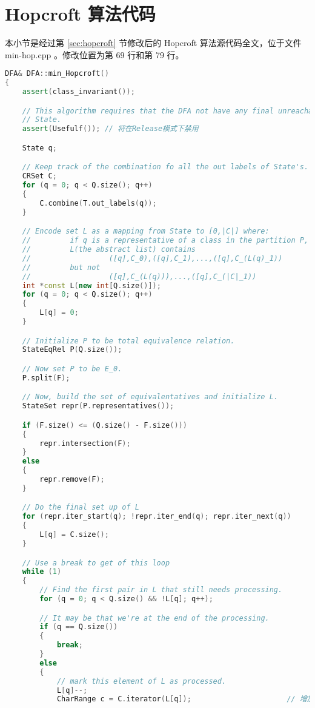 \section{Hopcroft 算法代码}

本小节是经过第 \ref{sec:hopcroft} 节修改后的 Hopcroft 算法源代码全文，位于文件 min-hop.cpp 。修改位置为第 69 行和第 79 行。

\begin{lstlisting}[language=C++,label={lst:hop},caption={文件 min-hop.cpp}]
DFA& DFA::min_Hopcroft()
{
    assert(class_invariant());

    // This algorithm requires that the DFA not have any final unreachable
    // State.
    assert(Usefulf()); // 将在Release模式下禁用

    State q;

    // Keep track of the combination fo all the out labels of State's.
    CRSet C;
    for (q = 0; q < Q.size(); q++)
    {
        C.combine(T.out_labels(q));
    }

    // Encode set L as a mapping from State to [0,|C|] where:
    //         if q is a representative of a class in the partition P, then
    //         L(the abstract list) contains
    //                  ([q],C_0),([q],C_1),...,([q],C_(L(q)_1))
    //         but not
    //                  ([q],C_(L(q))),...,([q],C_(|C|_1))
    int *const L(new int[Q.size()]);
    for (q = 0; q < Q.size(); q++)
    {
        L[q] = 0;
    }

    // Initialize P to be total equivalence relation.
    StateEqRel P(Q.size());

    // Now set P to be E_0.
    P.split(F);

    // Now, build the set of equivalentatives and initialize L.
    StateSet repr(P.representatives());

    if (F.size() <= (Q.size() - F.size()))
    {
        repr.intersection(F);
    }
    else
    {
        repr.remove(F);
    }

    // Do the final set up of L
    for (repr.iter_start(q); !repr.iter_end(q); repr.iter_next(q))
    {
        L[q] = C.size();
    }

    // Use a break to get of this loop
    while (1)
    {
        // Find the first pair in L that still needs processing.
        for (q = 0; q < Q.size() && !L[q]; q++);

        // It may be that we're at the end of the processing.
        if (q == Q.size())
        {
            break;
        }
        else
        {
            // mark this element of L as processed.
            L[q]--;
            CharRange c = C.iterator(L[q]);                      // 增加


\end{lstlisting}
